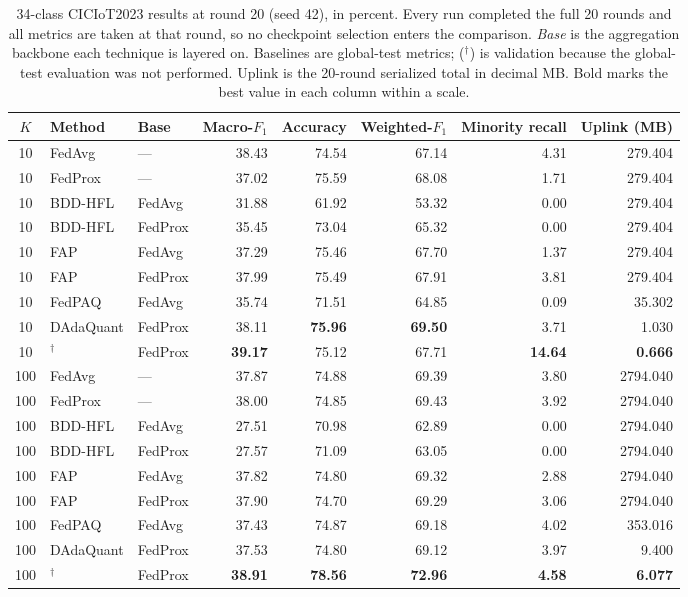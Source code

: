 \begin{table}[!t]
\centering\small
\caption{34-class CICIoT2023 results at round 20 (seed 42), in percent. Every run completed the full 20 rounds and all metrics are taken at that round, so no checkpoint selection enters the comparison. \emph{Base} is the aggregation backbone each technique is layered on. Baselines are global-test metrics; \method{} ($^\dagger$) is validation because the global-test evaluation was not performed. Uplink is the 20-round serialized total in decimal MB. Bold marks the best value in each column within a scale.}
\label{tab:main}
\begin{tabular}{cllrrrrr}
\toprule
$K$ & Method & Base & Macro-$F_1$ & Accuracy & Weighted-$F_1$ & Minority recall & Uplink (MB) \\
\midrule
10 & FedAvg & --- & 38.43 & 74.54 & 67.14 & 4.31 & 279.404 \\
10 & FedProx & --- & 37.02 & 75.59 & 68.08 & 1.71 & 279.404 \\
10 & BDD-HFL & FedAvg & 31.88 & 61.92 & 53.32 & 0.00 & 279.404 \\
10 & BDD-HFL & FedProx & 35.45 & 73.04 & 65.32 & 0.00 & 279.404 \\
10 & FAP & FedAvg & 37.29 & 75.46 & 67.70 & 1.37 & 279.404 \\
10 & FAP & FedProx & 37.99 & 75.49 & 67.91 & 3.81 & 279.404 \\
10 & FedPAQ & FedAvg & 35.74 & 71.51 & 64.85 & 0.09 & 35.302 \\
10 & DAdaQuant & FedProx & 38.11 & \textbf{75.96} & \textbf{69.50} & 3.71 & 1.030 \\
10 & \textbf{\method{}$^\dagger$} & FedProx & \textbf{39.17} & 75.12 & 67.71 & \textbf{14.64} & \textbf{0.666} \\
\midrule
100 & FedAvg & --- & 37.87 & 74.88 & 69.39 & 3.80 & 2794.040 \\
100 & FedProx & --- & 38.00 & 74.85 & 69.43 & 3.92 & 2794.040 \\
100 & BDD-HFL & FedAvg & 27.51 & 70.98 & 62.89 & 0.00 & 2794.040 \\
100 & BDD-HFL & FedProx & 27.57 & 71.09 & 63.05 & 0.00 & 2794.040 \\
100 & FAP & FedAvg & 37.82 & 74.80 & 69.32 & 2.88 & 2794.040 \\
100 & FAP & FedProx & 37.90 & 74.70 & 69.29 & 3.06 & 2794.040 \\
100 & FedPAQ & FedAvg & 37.43 & 74.87 & 69.18 & 4.02 & 353.016 \\
100 & DAdaQuant & FedProx & 37.53 & 74.80 & 69.12 & 3.97 & 9.400 \\
100 & \textbf{\method{}$^\dagger$} & FedProx & \textbf{38.91} & \textbf{78.56} & \textbf{72.96} & \textbf{4.58} & \textbf{6.077} \\
\bottomrule
\end{tabular}
\end{table}
